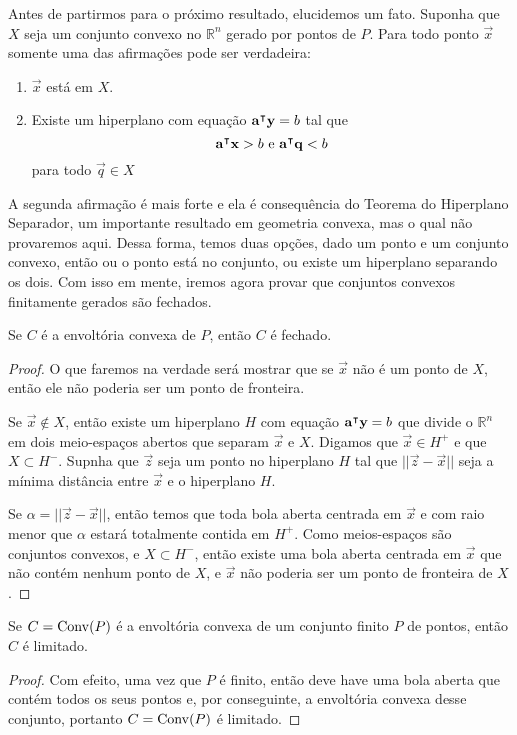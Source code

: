 Antes de partirmos para o próximo resultado, elucidemos um fato. Suponha que
$X$ seja um conjunto convexo no $\mathbb{R}^n$ gerado por pontos de $P$.
Para todo ponto $\vec x$ somente uma das afirmações pode ser verdadeira:

\begin{enumerate}
  \item $\vec x$ está em $X$.
  \item Existe um hiperplano com equação $\mathbf{a}^\intercal \mathbf y = b$ tal que
  \[
    \mathbf{a}^\intercal \mathbf x > b \text{ e } \mathbf{a}^\intercal \mathbf q < b
  \]
  para todo $\vec q \in X$
\end{enumerate}

A segunda afirmação é mais forte e ela é consequência do Teorema do
Hiperplano Separador, um importante resultado em geometria convexa, mas
o qual não provaremos aqui. Dessa forma, temos duas opções, dado um ponto
e um conjunto convexo, então ou o ponto está no conjunto, ou existe um
hiperplano separando os dois. Com isso em mente, iremos agora provar
que conjuntos convexos finitamente gerados são fechados.

\begin{prop:conjuntos convexos fechados}
Se $C$ é a envoltória convexa de $P$, então $C$ é fechado.
  \begin{proof}
    O que faremos na verdade será mostrar que se $\vec x$ não é um ponto de $X$,
    então ele não poderia ser um ponto de fronteira.

    Se $\vec x \notin X$, então existe um hiperplano $H$ com
    equação $\mathbf{a}^\intercal \mathbf y = b$ que divide
    o $\mathbb{R}^n$ em dois meio-espaços abertos que separam
    $\vec x$ e $X$. Digamos que $\vec x \in H^+$ e que $X \subset H^-$.
    Supnha que $\vec z$ seja um ponto no hiperplano $H$ tal que
    $|| \vec z - \vec x ||$ seja a mínima distância entre $\vec x$
    e o hiperplano $H$.

    Se $\alpha = || \vec z - \vec x ||$,
    então temos que toda bola aberta centrada em $\vec x$
    e com raio menor que $\alpha$ estará totalmente contida em
    $H^+$. Como meios-espaços são conjuntos convexos, e $X \subset H^-$,
    então existe uma bola aberta centrada em $\vec x$ que não
    contém nenhum ponto de $X$, e $\vec x$ não poderia ser
    um ponto de fronteira de $X$.
  \end{proof}
\end{prop:conjuntos convexos fechados}

\begin{prop:conjuntos convexos limitados}
  Se $C = \mathrm{Conv}(P)$ é a envoltória convexa de um conjunto finito $P$ de pontos,
  então $C$ é limitado.

  \begin{proof}
   Com efeito, uma vez que $P$ é finito, então deve have uma bola aberta que
   contém todos os seus pontos e, por conseguinte, a envoltória convexa desse
   conjunto, portanto $C = \mathrm{Conv}(P)$ é limitado.
  \end{proof}
\end{prop:conjuntos convexos limitados}

